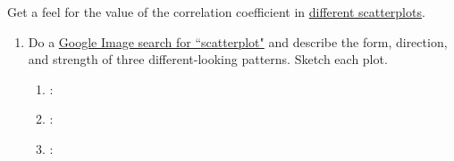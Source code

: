 \documentclass[10pt]{article}\usepackage[]{graphicx}\usepackage[]{color}
\begin{document}
Get a feel for the value of the correlation coefficient in \href{http://upload.wikimedia.org/wikipedia/commons/thumb/d/d4/Correlation_examples2.svg/1000px-Correlation_examples2.svg.png}{different scatterplots}.

\begin{enumerate}
  \item Do a \href{https://www.google.com/search?q=scatterplot&tbm=isch}{Google Image search for ``scatterplot"} and describe the form, direction, and strength of three different-looking patterns. Sketch each plot.
  \begin{enumerate}
    \itemsep1in
    \item :
    \item :
    \item :
    \vspace{0.5in}
  \end{enumerate}
\end{enumerate}
\end{document}
